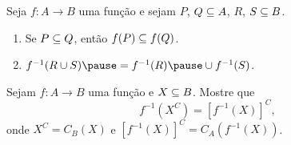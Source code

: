 \documentclass{beamer}
\begin{document}
    \begin{frame}
        \begin{proposicao}
            Seja $f : A \to B$ uma fun{\c c}{\~a}o \pause e sejam $P$, \pause $Q \subseteq A$, \pause $R$, \pause $S \subseteq B$.\pause
            \begin{enumerate}[label={\roman*})]
                \item Se $P \subseteq Q$, \pause ent{\~a}o $f(P) \subseteq f(Q)$.\pause

                \vspace{.5cm}

                \item $f^{-1}(R \cup S) \pause = f^{-1}(R) \pause \cup f^{-1}(S)$.
            \end{enumerate}
        \end{proposicao}
    \end{frame}

    \begin{frame}
        Sejam $f : A \to B$ uma função e $X \subseteq B$. Mostre que
        \[ f^{-1}(X^C) = [f^{-1}(X)]^C, \]
        onde $X^C = C_B(X)$  e $[f^{-1}(X)]^C = C_A(f^{-1}(X))$.
    \end{frame}
\end{document}
